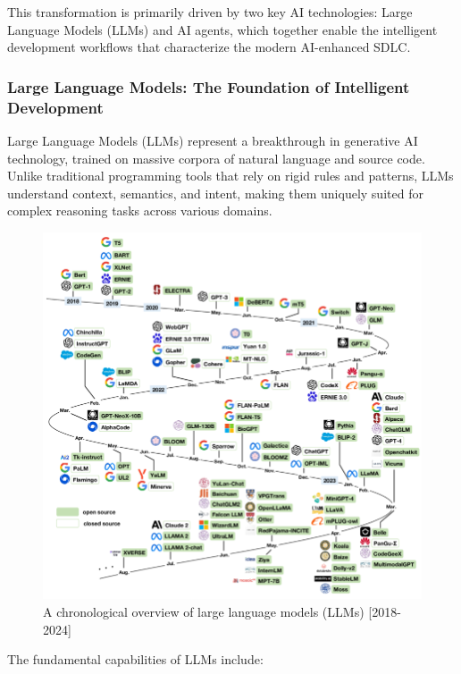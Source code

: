 \begin{spacing}{1.2}
This transformation is primarily driven by two key AI technologies: Large Language Models (LLMs) and AI agents, which together enable the intelligent development workflows that characterize the modern AI-enhanced SDLC.

\subsubsection*{Large Language Models: The Foundation of Intelligent Development}
Large Language Models (LLMs) represent a breakthrough in generative AI technology, trained on massive corpora of natural language and source code. Unlike traditional programming tools that rely on rigid rules and patterns, LLMs understand context, semantics, and intent, making them uniquely suited for complex reasoning tasks across various domains.

\begin{figure}[H]
    \centering
    \includegraphics[scale=1]{Images/A-chronological-overview-of-large-language-models-LLMs-multimodal-and-scientific.png}
    \caption{A chronological overview of large language models (LLMs) [2018-2024]}
    \label{fig:llm_overview}
\end{figure}

The fundamental capabilities of LLMs include:


\end{spacing}
